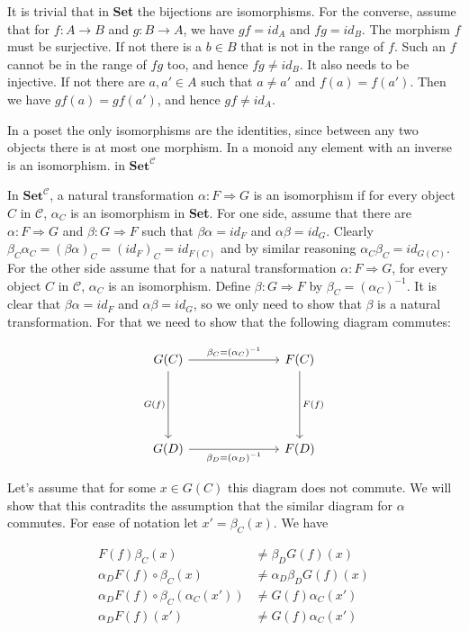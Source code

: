 It is trivial that in \textbf{Set} the bijections are isomorphisms. For the converse, assume that for $f:A\to B$ and $g:B\to A$, we have $gf=id_A$ and $fg=id_B$. The morphism $f$ must be surjective. If not there is a $b\in B$ that is not in the range of $f$. Such an $f$ cannot be in the range of $fg$ too, and hence $fg\neq id_B$. It also needs to be injective. If not there are $a,a'\in A$ such that $a\neq a'$ and $f(a)=f(a')$. Then we have $gf(a)=gf(a')$, and hence $gf\neq id_A$.

In a poset the only isomorphisms are the identities, since between any two objects there is at most one morphism. In a monoid any element with an inverse is an isomorphism. in $\textbf{Set}^\mathcal{C}$

In $\textbf{Set}^\mathcal{C}$, a natural transformation $\alpha:F\Rightarrow G$ is an isomorphism if for every object $C$ in $\mathcal{C}$, $\alpha_C$ is an isomorphism in \textbf{Set}. For one side, assume that there are $\alpha:F\Rightarrow G$ and $\beta:G\Rightarrow F$ such that $\beta\alpha=id_F$ and $\alpha\beta=id_G$. Clearly $\beta_C\alpha_C=(\beta\alpha)_C=(id_F)_C=id_{F(C)}$ and by similar reasoning $\alpha_C\beta_C=id_{G(C)}$. For the other side assume that for a natural transformation $\alpha:F\Rightarrow G$, for every object $C$ in $\mathcal{C}$, $\alpha_C$ is an isomorphism. Define $\beta:G\Rightarrow F$ by $\beta_C=(\alpha_C)^{-1}$. It is clear that $\beta\alpha=id_F$ and $\alpha\beta=id_G$, so we only need to show that $\beta$ is a natural transformation.
For that we need to show that the following diagram commutes:

\[\begin{tikzcd}
	{G(C)} &&& {F(C)} \\
	\\
	\\
	{G(D)} &&& {F(D)}
	\arrow["{\beta_C=(\alpha_C)^{-1}}", from=1-1, to=1-4]
	\arrow["{F(f)}", from=1-4, to=4-4]
	\arrow["{G(f)}"', from=1-1, to=4-1]
	\arrow["{\beta_D=(\alpha_D)^{-1}}"', from=4-1, to=4-4]
\end{tikzcd}\]

Let's assume that for some $x\in G(C)$ this diagram does not commute. We will show that this contradits the assumption that the similar diagram for $\alpha$ commutes. For ease of notation let $x'=\beta_C(x)$. We have

\begin{align*}
F(f)\beta_C(x)&\neq\beta_DG(f)(x)\\
\alpha_DF(f)\circ\beta_C(x)&\neq\alpha_D\beta_DG(f)(x)\\
\alpha_DF(f)\circ\beta_C(\alpha_C(x'))&\neq G(f)\alpha_C(x')\\
\alpha_DF(f)(x')&\neq G(f)\alpha_C(x')
\end{align*}
